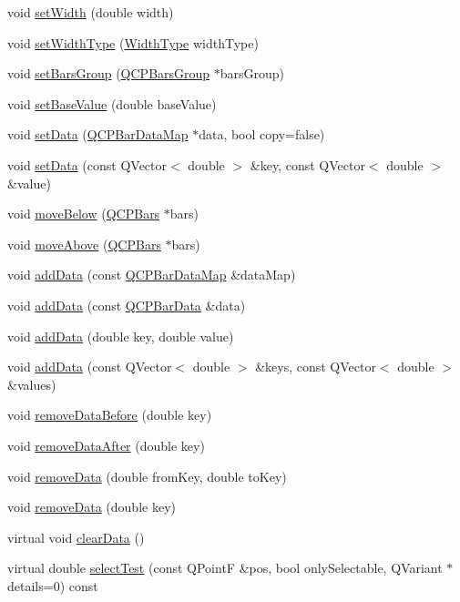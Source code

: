 \begin{DoxyCompactItemize}
\item 
void \hyperlink{classQCPBars_afec6116579d44d5b706e0fa5e5332507}{set\-Width} (double width)
\item 
void \hyperlink{classQCPBars_adcaa3b41281bb2c0f7949b341592fcc0}{set\-Width\-Type} (\hyperlink{classQCPBars_a65dbbf1ab41cbe993d71521096ed4649}{\-Width\-Type} width\-Type)
\item 
void \hyperlink{classQCPBars_aedd1709061f0b307c47ddb45e172ef9a}{set\-Bars\-Group} (\hyperlink{classQCPBarsGroup}{\-Q\-C\-P\-Bars\-Group} $\ast$bars\-Group)
\item 
void \hyperlink{classQCPBars_a574ec7eb7537566df1a28ff085d75623}{set\-Base\-Value} (double base\-Value)
\item 
void \hyperlink{classQCPBars_aa3435aab19e0a49e4e7b41bd36a8d96b}{set\-Data} (\hyperlink{qcustomplot_8h_aa846c77472cae93def9f1609d0c57191}{\-Q\-C\-P\-Bar\-Data\-Map} $\ast$data, bool copy=false)
\item 
void \hyperlink{classQCPBars_a3efded5df4a82ecb201f7c28099fa2e5}{set\-Data} (const \-Q\-Vector$<$ double $>$ \&key, const \-Q\-Vector$<$ double $>$ \&value)
\item 
void \hyperlink{classQCPBars_a69fc371346980f19177c3d1ecdad78ee}{move\-Below} (\hyperlink{classQCPBars}{\-Q\-C\-P\-Bars} $\ast$bars)
\item 
void \hyperlink{classQCPBars_ac22e00a6a41509538c21b04f0a57318c}{move\-Above} (\hyperlink{classQCPBars}{\-Q\-C\-P\-Bars} $\ast$bars)
\item 
void \hyperlink{classQCPBars_a1f29cf08615040993209147fa68de3f2}{add\-Data} (const \hyperlink{qcustomplot_8h_aa846c77472cae93def9f1609d0c57191}{\-Q\-C\-P\-Bar\-Data\-Map} \&data\-Map)
\item 
void \hyperlink{classQCPBars_a142158b1addefd53259002dd3ab22c3a}{add\-Data} (const \hyperlink{classQCPBarData}{\-Q\-C\-P\-Bar\-Data} \&data)
\item 
void \hyperlink{classQCPBars_a684dd105403a5497fda42f2094fecbb7}{add\-Data} (double key, double value)
\item 
void \hyperlink{classQCPBars_a3679a0a9decab0fa03f8f4c6e3344d52}{add\-Data} (const \-Q\-Vector$<$ double $>$ \&keys, const \-Q\-Vector$<$ double $>$ \&values)
\item 
void \hyperlink{classQCPBars_a9d12779a3fad4820aad2c428f368298d}{remove\-Data\-Before} (double key)
\item 
void \hyperlink{classQCPBars_a99de6e7abbbf03fb41fa604c7f08aa8b}{remove\-Data\-After} (double key)
\item 
void \hyperlink{classQCPBars_a1fe9bcb57d670defea1bb65cadf43765}{remove\-Data} (double from\-Key, double to\-Key)
\item 
void \hyperlink{classQCPBars_a837cc9848ad3edd40a6130b508493f93}{remove\-Data} (double key)
\item 
virtual void \hyperlink{classQCPBars_a11dbbd707132f07f862dff13c5789c2b}{clear\-Data} ()
\item 
virtual double \hyperlink{classQCPBars_a0d37a9feb1d0baf73ce6e809db214445}{select\-Test} (const \-Q\-Point\-F \&pos, bool only\-Selectable, \-Q\-Variant $\ast$details=0) const 
\end{DoxyCompactItemize}
